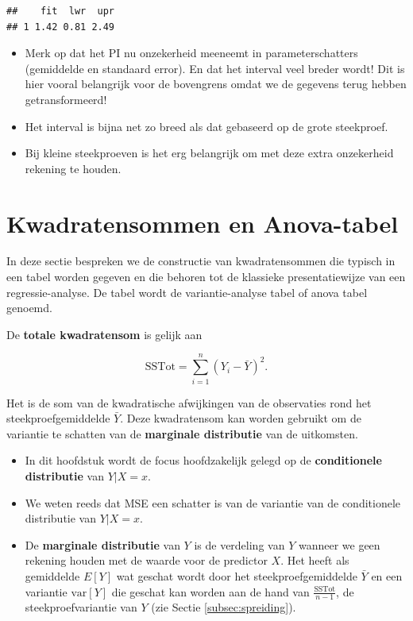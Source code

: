 \documentclass[
  12pt,dutch,coursenotes]{book}
\providecommand{\tightlist}{%
  \setlength{\itemsep}{0pt}\setlength{\parskip}{0pt}}
\begin{document}
\begin{lstlisting}
##    fit  lwr  upr
## 1 1.42 0.81 2.49
\end{lstlisting}

\begin{itemize}
\item
  Merk op dat het PI nu onzekerheid meeneemt in parameterschatters (gemiddelde en standaard error).
  En dat het interval veel breder wordt! Dit is hier vooral belangrijk voor de bovengrens omdat we de gegevens terug hebben getransformeerd!
\item
  Het interval is bijna net zo breed als dat gebaseerd op de grote steekproef.
\item
  Bij kleine steekproeven is het erg belangrijk om met deze extra onzekerheid rekening te houden.
\end{itemize}

\hypertarget{sec:linAnova}{%
\section{Kwadratensommen en Anova-tabel}\label{sec:linAnova}}

In deze sectie bespreken we de constructie van kwadratensommen die typisch in een tabel worden gegeven en die behoren tot de klassieke presentatiewijze van een regressie-analyse.
De tabel wordt de variantie-analyse tabel of anova tabel genoemd.

De \textbf{totale kwadratensom} is gelijk aan

\[\text{SSTot} = \sum_{i=1}^n (Y_i-\bar{Y})^2.\]

Het is de som van de kwadratische afwijkingen van de observaties rond het steekproefgemiddelde \(\bar Y\).
Deze kwadratensom kan worden gebruikt om de variantie te schatten van de \textbf{marginale distributie} van de uitkomsten.

\begin{itemize}
\tightlist
\item
  In dit hoofdstuk wordt de focus hoofdzakelijk gelegd op de \textbf{conditionele distributie} van \(Y\vert X=x\).
\item
  We weten reeds dat MSE een schatter is van de variantie van de conditionele distributie van \(Y\vert X=x\).
\item
  De \textbf{marginale distributie} van \(Y\) is de verdeling van \(Y\) wanneer we geen rekening houden met de waarde voor de predictor \(X\). Het heeft als gemiddelde \(E[Y]\) wat geschat wordt door het steekproefgemiddelde \(\bar{Y}\) en een variantie \(\text{var}[Y]\) die geschat kan worden aan de hand van \(\frac{\text{SSTot}}{n-1}\), de steekproefvariantie van \(Y\) (zie Sectie \ref{subsec:spreiding}).
\end{itemize}
\end{document}
